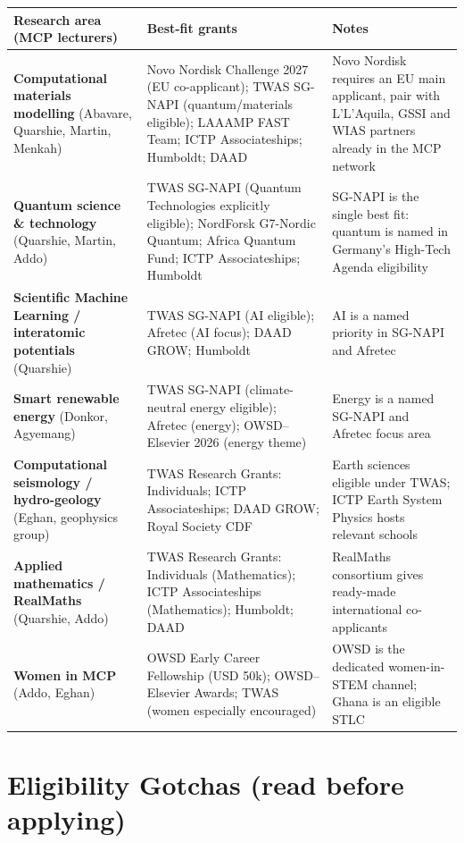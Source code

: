 \documentclass[11pt,a4paper]{article}
\begin{document}
\begin{longtable}{@{}p{3.6cm}p{6.4cm}p{4.0cm}@{}}
\toprule
\textbf{Research area (MCP lecturers)} & \textbf{Best-fit grants} & \textbf{Notes} \\
\midrule
\endhead
\textbf{Computational materials modelling} (Abavare, Quarshie, Martin, Menkah) & Novo Nordisk Challenge 2027 (EU co-applicant); TWAS SG-NAPI (quantum/materials eligible); LAAAMP FAST Team; ICTP Associateships; Humboldt; DAAD & Novo Nordisk requires an EU main applicant, pair with L'L’Aquila, GSSI and WIAS partners already in the MCP network \\
\midrule
\textbf{Quantum science \& technology} (Quarshie, Martin, Addo) & TWAS SG-NAPI (Quantum Technologies explicitly eligible); NordForsk G7-Nordic Quantum; Africa Quantum Fund; ICTP Associateships; Humboldt & SG-NAPI is the single best fit: quantum is named in Germany's High-Tech Agenda eligibility \\
\midrule
\textbf{Scientific Machine Learning / interatomic potentials} (Quarshie) & TWAS SG-NAPI (AI eligible); Afretec (AI focus); DAAD GROW; Humboldt & AI is a named priority in SG-NAPI and Afretec \\
\midrule
\textbf{Smart renewable energy} (Donkor, Agyemang) & TWAS SG-NAPI (climate-neutral energy eligible); Afretec (energy); OWSD--Elsevier 2026 (energy theme) & Energy is a named SG-NAPI and Afretec focus area \\
\midrule
\textbf{Computational seismology / hydro-geology} (Eghan, geophysics group) & TWAS Research Grants: Individuals; ICTP Associateships; DAAD GROW; Royal Society CDF & Earth sciences eligible under TWAS; ICTP Earth System Physics hosts relevant schools \\
\midrule
\textbf{Applied mathematics / RealMaths} (Quarshie, Addo) & TWAS Research Grants: Individuals (Mathematics); ICTP Associateships (Mathematics); Humboldt; DAAD & RealMaths consortium gives ready-made international co-applicants \\
\midrule
\textbf{Women in MCP} (Addo, Eghan) & OWSD Early Career Fellowship (USD 50k); OWSD--Elsevier Awards; TWAS (women especially encouraged) & OWSD is the dedicated women-in-STEM channel; Ghana is an eligible STLC \\
\bottomrule
\end{longtable}

\section{Eligibility Gotchas (read before applying)}
\end{document}
